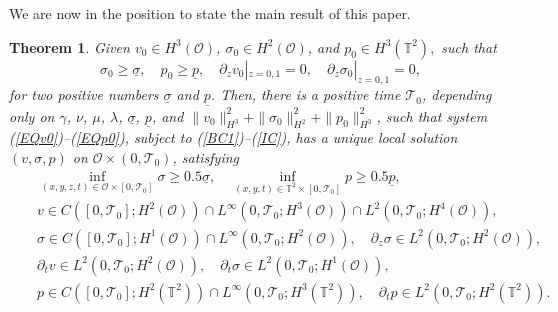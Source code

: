 \documentclass[12pt,reqno]{amsart}
\numberwithin{equation}{section}
\newtheorem{theorem}{Theorem}[section]
\begin{document}
We are now in the position to state the main result of this paper.

\begin{theorem}\label{thmmain}
Given $v_{0}\in H^3(\mathcal O)$, $\sigma_{0} \in H^2(\mathcal O)$, and $p_{0}\in H^3(\mathbb T^2),$ such that
$$
\sigma_{0}\geq\underline\sigma, \quad p_{0}\geq\underline p,\quad \partial_zv_{0}|_{z=0,1}=0,\quad \partial_z\sigma_{0}|_{z=0,1}=0,
$$
for two positive numbers $\underline\sigma$ and $\underline p$.
Then, there is a positive time $\mathcal T_0$,
depending only on $\gamma$, $\nu$, $\mu$, $\lambda$, $\underline\sigma$, $\underline p$, and
  $\|v_{0}\|_{H^3}^2+\|\sigma_{0}\|_{H^2}^2+\|p_0\|_{H^3}^2$, such that system (\ref{EQv0})--(\ref{EQp0}),
  subject to (\ref{BC1})--(\ref{IC}), has a unique local solution $(v,\sigma,p)$ on $\mathcal O\times(0,\mathcal T_0)$,
  satisfying
  \begin{eqnarray*}
  &&\inf_{(x,y,z,t)\in\mathcal O\times[0,\mathcal T_0]}\sigma\geq0.5\underline\sigma,\quad \inf_{(x,y,t)\in\mathbb T^2\times[0,\mathcal T_0]}p\geq0.5\underline p,\\
    &&v\in C([0,\mathcal T_0]; H^2(\mathcal O))\cap L^\infty(0,\mathcal T_0; H^3(\mathcal O))\cap L^2(0,\mathcal T_0; H^4(\mathcal O)),\\
    &&\sigma\in C([0,\mathcal T_0]; H^1(\mathcal O))\cap L^\infty(0,\mathcal T_0; H^2(\mathcal O)),\quad \partial_z\sigma\in L^2(0,\mathcal T_0; H^2(\mathcal O)),\\
    &&\partial_tv\in L^2(0,\mathcal T_0; H^2(\mathcal O)),\quad \partial_t\sigma\in L^2(0,\mathcal T_0; H^1(\mathcal O)),\\
    &&p\in C([0,\mathcal T_0]; H^2(\mathbb T^2))\cap L^\infty(0,\mathcal T_0; H^3(\mathbb T^2)),\quad\partial_tp\in  L^2(0,\mathcal T_0; H^2(\mathbb T^2)).
  \end{eqnarray*}
\end{theorem}
\end{document}
